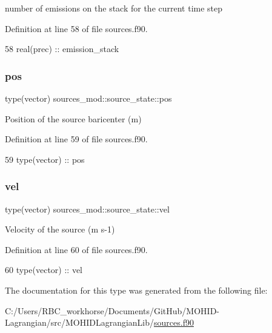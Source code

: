 number of emissions on the stack for the current time step 



Definition at line 58 of file sources.\+f90.


\begin{DoxyCode}
58         \textcolor{keywordtype}{real(prec)} :: emission\_stack
\end{DoxyCode}
\mbox{\label{structsources__mod_1_1source__state_a8dacf7040158bb5214f66476bf1a1c3d}} 
\subsubsection{\texorpdfstring{pos}{pos}}
{\footnotesize\ttfamily type(vector) sources\+\_\+mod\+::source\+\_\+state\+::pos\hspace{0.3cm}{\ttfamily [private]}}



Position of the source baricenter (m) 



Definition at line 59 of file sources.\+f90.


\begin{DoxyCode}
59         \textcolor{keywordtype}{type}(vector) :: pos
\end{DoxyCode}
\mbox{\label{structsources__mod_1_1source__state_a52c6f025eb262a7a07b2a8b4ec7065ac}} 
\subsubsection{\texorpdfstring{vel}{vel}}
{\footnotesize\ttfamily type(vector) sources\+\_\+mod\+::source\+\_\+state\+::vel\hspace{0.3cm}{\ttfamily [private]}}



Velocity of the source (m s-\/1) 



Definition at line 60 of file sources.\+f90.


\begin{DoxyCode}
60         \textcolor{keywordtype}{type}(vector) :: vel
\end{DoxyCode}


The documentation for this type was generated from the following file\+:\begin{DoxyCompactItemize}
\item 
C\+:/\+Users/\+R\+B\+C\+\_\+workhorse/\+Documents/\+Git\+Hub/\+M\+O\+H\+I\+D-\/\+Lagrangian/src/\+M\+O\+H\+I\+D\+Lagrangian\+Lib/\mbox{\hyperlink{sources_8f90}{sources.\+f90}}\end{DoxyCompactItemize}
